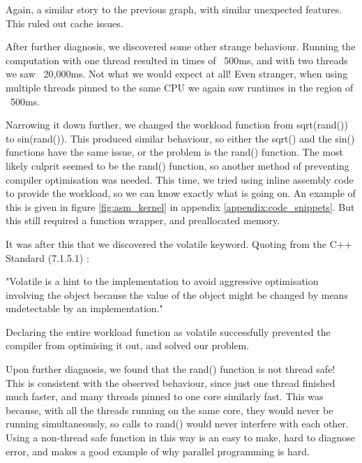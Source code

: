 Again, a similar story to the previous graph, with similar unexpected features. This ruled out cache issues. 

After further diagnosis, we discovered some other strange behaviour. Running the computation with one thread resulted in times of ~500ms, and with two threads we saw ~20,000ms. Not what we would expect at all! Even stranger, when using multiple threads pinned to the same CPU we again saw runtimes in the region of ~500ms. 

Narrowing it down further, we changed the workload function from sqrt(rand()) to sin(rand()). This produced similar behaviour, so either the sqrt() and the sin() functions have the same issue, or the problem is the rand() function. The most likely culprit seemed to be the rand() function, so another method of preventing compiler optimisation was needed. This time, we tried using inline assembly code to provide the workload, so we can know exactly what is going on. An example of this is given in figure \ref{fig:asm_kernel} in appendix \ref{appendix:code_snippets}. But this still required a function wrapper, and preallocated memory.

It was after this that we discovered the volatile keyword. Quoting from the C++ Standard (7.1.5.1) \cite{cpp_standard}:

"Volatile is a hint to the implementation to avoid aggressive optimisation involving the object because the value of the object might be changed by means undetectable by an implementation."

Declaring the entire workload function as volatile successfully prevented the compiler from optimising it out, and solved our problem.

Upon further diagnosis, we found that the rand() function is not thread safe! This is consistent with the observed behaviour, since just one thread finished much faster, and many threads pinned to one core similarly fast. This was because, with all the threads running on the same core, they would never be running simultaneously, so calls to rand() would never interfere with each other. Using a non-thread safe function in this way is an easy to make, hard to diagnose error, and makes a good example of why parallel programming is hard.